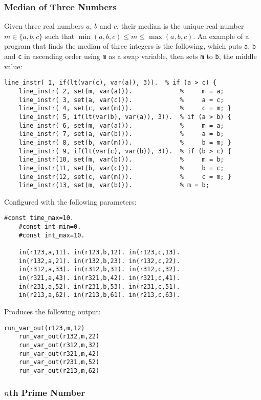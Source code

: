 \documentclass[a4paper,twoside,notitlepage]{report}
\begin{document}
\subsubsection{Median of Three Numbers}

Given three real numbers $a$, $b$ and $c$, their median is the unique real 
number $m\in\{a,b,c\}$ such that $\min(a,b,c)\leq m\leq\max(a,b,c)$. An 
example of a program that finds the median of three integers is the 
following, which puts \verb|a|, \verb|b| and \verb|c| in ascending order 
using \verb|m| as a swap variable, then sets \verb|m| to \verb|b|, the 
middle value:
\begin{Verbatim}[samepage=true]
    line_instr( 1, if(lt(var(c), var(a)), 3)).  % if (a > c) {
    line_instr( 2, set(m, var(a))).             %     m = a;
    line_instr( 3, set(a, var(c))).             %     a = c;
    line_instr( 4, set(c, var(m))).             %     c = m; }
    line_instr( 5, if(lt(var(b), var(a)), 3)).  % if (a > b) {
    line_instr( 6, set(m, var(a))).             %     m = a;
    line_instr( 7, set(a, var(b))).             %     a = b;
    line_instr( 8, set(b, var(m))).             %     b = m; }
    line_instr( 9, if(lt(var(c), var(b)), 3)).  % if (b > c) {
    line_instr(10, set(m, var(b))).             %     m = b;
    line_instr(11, set(b, var(c))).             %     b = c;
    line_instr(12, set(c, var(m))).             %     c = m; }
    line_instr(13, set(m, var(b))).             % m = b;
\end{Verbatim}

Configured with the following parameters:
\begin{Verbatim}[samepage=true]
    #const time_max=10.
    #const int_min=0.
    #const int_max=10.

    in(r123,a,11). in(r123,b,12). in(r123,c,13).
    in(r132,a,21). in(r132,b,23). in(r132,c,22).
    in(r312,a,33). in(r312,b,31). in(r312,c,32).
    in(r321,a,43). in(r321,b,42). in(r321,c,41).
    in(r231,a,52). in(r231,b,53). in(r231,c,51).
    in(r213,a,62). in(r213,b,61). in(r213,c,63).
\end{Verbatim}

Produces the following output:
\begin{Verbatim}[samepage=true]
    run_var_out(r123,m,12)
    run_var_out(r132,m,22)
    run_var_out(r312,m,32)
    run_var_out(r321,m,42)
    run_var_out(r231,m,52)
    run_var_out(r213,m,62)
\end{Verbatim}

\subsubsection{$n$th Prime Number}
\end{document}
